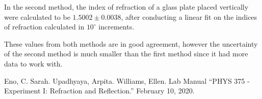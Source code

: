 \documentclass[colorlinks=true,pdfstartview=FitV,linkcolor=blue,
            citecolor=red,urlcolor=magenta]{basedoc}
\begin{document}
  In the second method, the index of refraction of a glass plate placed vertically were calculated to be $1.5002 \pm 0.0038$, after conducting a linear fit on the indices of refraction calculated in $10^{\circ}$ increments.

  These values from both methods are in good agreement, however the uncertainty of the second method is much smaller than the first method since it had more data to work with.



\begin{thebibliography}{9}

    Eno, C. Sarah. Upadhyaya, Arpita. Williams, Ellen. Lab Manual ``PHYS 375 - Experiment I: Refraction and Reflection.'' February 10, 2020.

\end{thebibliography} %
\end{document}
